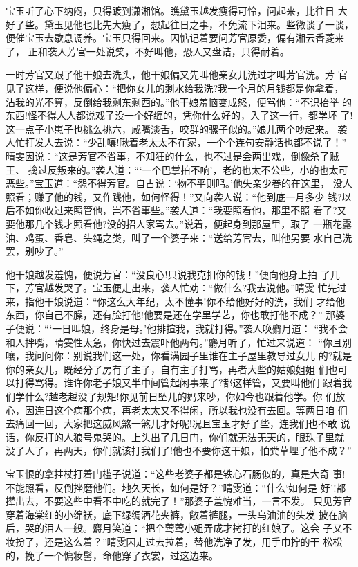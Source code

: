 宝玉听了心下纳闷，只得踱到潇湘馆。瞧黛玉越发瘦得可怜，问起来，比往日
大好了些。黛玉见他也比先大瘦了，想起往日之事，不免流下泪来。些微谈了一谈，
便催宝玉去歇息调养。宝玉只得回来。因惦记着要问芳官原委，偏有湘云香菱来了，
正和袭人芳官一处说笑，不好叫他，恐人又盘诘，只得耐着。

一时芳官又跟了他干娘去洗头，他干娘偏又先叫他亲女儿洗过才叫芳官洗。芳
官见了这样，便说他偏心：“把你女儿的剩水给我洗?我一个月的月钱都是你拿着，
沾我的光不算，反倒给我剩东剩西的。”他干娘羞恼变成怒，便骂他：“不识抬举
的东西!怪不得人人都说戏子没一个好缠的，凭你什么好的，入了这一行，都学坏
了!这一点子小崽子也挑么挑六，咸嘴淡舌，咬群的骡子似的。”娘儿两个吵起来。
袭人忙打发人去说：“少乱嚷!瞅着老太太不在家，一个个连句安静话也都不说了！”
晴雯因说：“这是芳官不省事，不知狂的什么，也不过是会两出戏，倒像杀了贼王、
擒过反叛来的。”袭人道：“‘一个巴掌拍不响’，老的也太不公些，小的也太可
恶些。”宝玉道：“怨不得芳官。自古说：‘物不平则鸣。’他失亲少眷的在这里，
没人照看；赚了他的钱，又作践他，如何怪得！”又向袭人说：“他到底一月多少
钱?以后不如你收过来照管他，岂不省事些。”袭人道：“我要照看他，那里不照
看了?又要他那几个钱才照看他?没的招人家骂去。”说着，便起身到那屋里，取了
一瓶花露油、鸡蛋、香皂、头绳之类，叫了一个婆子来：“送给芳官去，叫他另要
水自己洗罢，别吵了。”

他干娘越发羞愧，便说芳官：“没良心!只说我克扣你的钱！”便向他身上拍
了几下，芳官越发哭了。宝玉便走出来，袭人忙劝：“做什么?我去说他。”晴雯
忙先过来，指他干娘说道：“你这么大年纪，太不懂事!你不给他好好的洗，我们
才给他东西，你自己不臊，还有脸打他!他要是还在学里学艺，你也敢打他不成？”
那婆子便说：“‘一日叫娘，终身是母。’他排揎我，我就打得。”袭人唤麝月道：
“我不会和人拌嘴，晴雯性太急，你快过去震吓他两句。”麝月听了，忙过来说道：
“你且别嚷，我问问你：别说我们这一处，你看满园子里谁在主子屋里教导过女儿
的?就是你的亲女儿，既经分了房有了主子，自有主子打骂，再者大些的姑娘姐姐
们也可以打得骂得。谁许你老子娘又半中间管起闲事来了?都这样管，又要叫他们
跟着我们学什么?越老越没了规矩!你见前日坠儿的妈来吵，你如今也跟着他学。你
们放心，因连日这个病那个病，再老太太又不得闲，所以我也没有去回。等两日咱
们去痛回一回，大家把这威风煞一煞儿才好呢!况且宝玉才好了些，连我们也不敢
说话，你反打的人狼号鬼哭的。上头出了几日门，你们就无法无天的，眼珠子里就
没了人了，再两天，你们就该打我们了!他也不要你这干娘，怕粪草埋了他不成？”

宝玉恨的拿拄杖打着门槛子说道：“这些老婆子都是铁心石肠似的，真是大奇
事!不能照看，反倒挫磨他们。地久天长，如何是好？”晴雯道：“什么‘如何是
好’!都撵出去，不要这些中看不中吃的就完了！”那婆子羞愧难当，一言不发。
只见芳官穿着海棠红的小绵袄，底下绿绸洒花夹裤，敞着裤腿，一头乌油油的头发
披在脑后，哭的泪人一般。麝月笑道：“把个莺莺小姐弄成才拷打的红娘了。这会
子又不妆扮了，还是这么着？”晴雯因走过去拉着，替他洗净了发，用手巾拧的干
松松的，挽了一个慵妆髻，命他穿了衣裳，过这边来。

